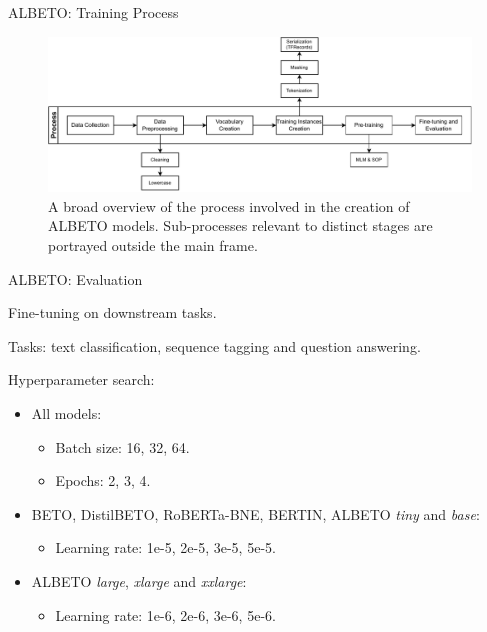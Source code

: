 \documentclass[aspectratio=169,xcolor=dvipsnames]{beamer}
\newenvironment{wideitemize}{\itemize\addtolength{\itemsep}{10pt}}{\enditemize}
\begin{document}
\begin{frame}{ALBETO: Training Process}

\begin{figure}
    \centering
    \includegraphics[width=\columnwidth]{images/ALBETO-training-process-diagram.pdf}
    \caption{A broad overview of the process involved in the creation of ALBETO models. Sub-processes relevant to distinct stages are portrayed outside the main frame.}
    \label{fig:ALBETO-training-process-diagram}
\end{figure}

\end{frame}
\begin{frame}{ALBETO: Evaluation}

\begin{wideitemize}
    \item Fine-tuning on downstream tasks.
    \item Tasks: text classification, sequence tagging and question answering.
    \item Hyperparameter search:
    \begin{itemize}
        \item All models:
        \begin{itemize}
            \item Batch size: 16, 32, 64.
            \item Epochs: 2, 3, 4.
        \end{itemize}
        \item BETO, DistilBETO, RoBERTa-BNE, BERTIN, ALBETO \textit{tiny} and \textit{base}:
        \begin{itemize}
            \item Learning rate: 1e-5, 2e-5, 3e-5, 5e-5.
        \end{itemize}
        \item ALBETO \textit{large}, \textit{xlarge} and \textit{xxlarge}:
        \begin{itemize}
            \item Learning rate: 1e-6, 2e-6, 3e-6, 5e-6.
        \end{itemize}
    \end{itemize}
\end{wideitemize}

\end{frame}
\end{document}

